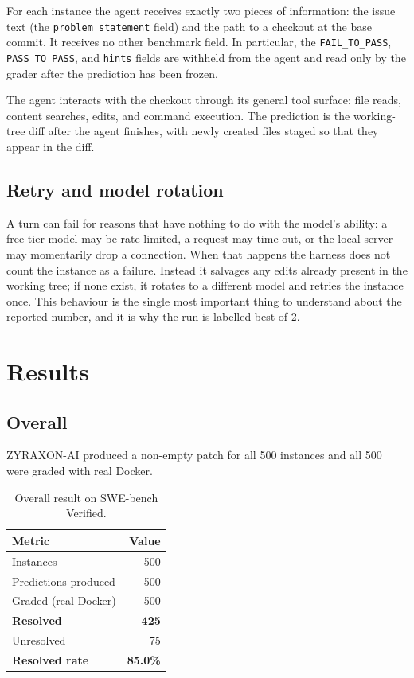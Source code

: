 \documentclass[11pt,a4paper]{article}
\begin{document}
For each instance the agent receives exactly two pieces of information: the issue text
(the \texttt{problem\_statement} field) and the path to a checkout at the base commit.
It receives no other benchmark field. In particular, the \texttt{FAIL\_TO\_PASS},
\texttt{PASS\_TO\_PASS}, and \texttt{hints} fields are withheld from the agent and read
only by the grader after the prediction has been frozen.

The agent interacts with the checkout through its general tool surface: file reads,
content searches, edits, and command execution. The prediction is the working-tree diff
after the agent finishes, with newly created files staged so that they appear in the
diff.

\subsection{Retry and model rotation}

A turn can fail for reasons that have nothing to do with the model's ability: a
free-tier model may be rate-limited, a request may time out, or the local server may
momentarily drop a connection. When that happens the harness does not count the instance
as a failure. Instead it salvages any edits already present in the working tree; if none
exist, it rotates to a different model and retries the instance once. This behaviour is
the single most important thing to understand about the reported number, and it is why
the run is labelled best-of-2.

\section{Results}
\label{sec:results}

\subsection{Overall}

ZYRAXON-AI produced a non-empty patch for all 500 instances and all 500 were graded with
real Docker.

\begin{table}[H]
\centering
\caption{Overall result on SWE-bench Verified.}
\label{tab:overall}
\begin{tabular}{@{}lr@{}}
\toprule
Metric & Value \\
\midrule
Instances & 500 \\
Predictions produced & 500 \\
Graded (real Docker) & 500 \\
\textbf{Resolved} & \textbf{425} \\
Unresolved & 75 \\
\textbf{Resolved rate} & \textbf{85.0\%} \\
\bottomrule
\end{tabular}
\end{table}
\end{document}
